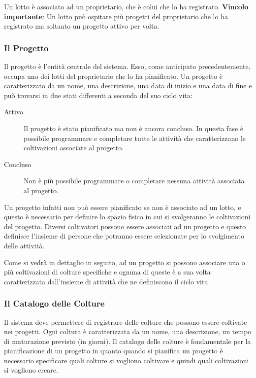 \documentclass[12pt,a4paper]{article}
\begin{document}
Un lotto è associato ad un proprietario, che è colui che lo ha registrato. \textbf{Vincolo importante}: Un lotto può ospitare più progetti del proprietario che lo ha registrato ma soltanto un progetto attivo per volta.

\subsubsection{Il Progetto}

Il progetto è l'entità centrale del sistema. Esso, come anticipato precedentemente, occupa uno dei lotti del proprietario che lo ha pianificato. Un progetto è caratterizzato da un nome, una descrizione, una data di inizio e una data di fine e può trovarsi in due stati differenti a seconda del suo ciclo vita:

\begin{description}
    \item[Attivo] Il progetto è stato pianificato ma non è ancora concluso. In questa fase è possibile programmare e completare tutte le attività che caratterizzano le coltivazioni associate al progetto.
    \item[Concluso] Non è più possibile programmare o completare nessuna attività associata al progetto.
\end{description}

Un progetto infatti non può essere pianificato se non è associato ad un lotto, e questo è necessario per definire lo spazio fisico in cui si svolgeranno le coltivazioni del progetto. Diversi coltivatori possono essere associati ad un progetto e questo definisce l'insieme di persone che potranno essere selezionate per lo svolgimento delle attività. 

Come si vedrà in dettaglio in seguito, ad un progetto si possono associare una o più coltivazioni di colture specifiche e ognuna di queste è a sua volta caratterizzata dall'insieme di attività che ne definiscono il ciclo vita.

\subsubsection{Il Catalogo delle Colture}

Il sistema deve permettere di registrare delle colture che possono essere coltivate nei progetti. Ogni coltura è caratterizzata da un nome, una descrizione, un tempo di maturazione previsto (in giorni). Il catalogo delle colture è fondamentale per la pianificazione di un progetto in quanto quando si pianifica un progetto è necessario specificare quali colture si vogliono coltivare e quindi quali coltivazioni si vogliono creare.
\end{document}
